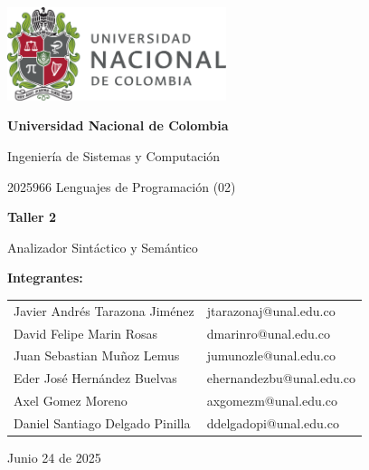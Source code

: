\documentclass{article}
\begin{document}
\begin{titlepage}
  \centering
  \includegraphics[width=0.48\textwidth]{logo_universidad.png}
  \par\vspace{2cm}

  {\Large \textbf{Universidad Nacional de Colombia} \par}
  \vspace{0.5cm}
  {\large Ingeniería de Sistemas y Computación \par}
  {\large 2025966 Lenguajes de Programación (02)\par}
  \vspace{3cm}

  {\large \textbf{Taller 2} \par}
  {\large Analizador Sintáctico y Semántico\par}
  \vspace{3cm}

  {\large \textbf{Integrantes:} \par}
  \vspace{0.5cm}
  \begin{tabular}{ll}
    Javier Andrés Tarazona Jiménez   & jtarazonaj@unal.edu.co \\
    David Felipe Marin Rosas         & dmarinro@unal.edu.co   \\
    Juan Sebastian Muñoz Lemus       & jumunozle@unal.edu.co          \\
    Eder José Hernández Buelvas      & ehernandezbu@unal.edu.co          \\
    Axel Gomez Moreno                & axgomezm@unal.edu.co          \\
    Daniel Santiago Delgado Pinilla  & ddelgadopi@unal.edu.co          \\
  \end{tabular}
  \par\vspace{3cm}

  {\large Junio 24 de 2025 \par}
\end{titlepage}
\end{document}
